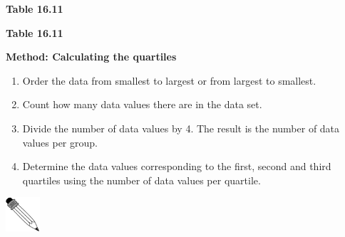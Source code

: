 \begin{description}[noitemsep]
\begin{description}[noitemsep]
\begin{table}[H]
\begin{center}
\begin{xtabular}[t]{|c|c|c|c|c|c|c|c|c|c|c|}
    \end{xtabular}
      \end{center}
    \begin{center}{\small\bfseries Table 16.11}\end{center}
    \begin{caption}{\small\bfseries Table 16.11}\end{caption}
\end{table}
    \par
          \label{m39400*id213452}
            \textbf{Method: Calculating the quartiles}
          \par 
          \label{m39400*id213459}\begin{enumerate}[noitemsep, label=\textbf{\arabic*}. ] 
            \label{m39400*uid76}\item Order the data from smallest to largest or from largest to smallest.
\label{m39400*uid77}\item Count how many data values there are in the data set.
\label{m39400*uid78}\item Divide the number of data values by 4. The result is the number of data values per group.
\label{m39400*uid79}\item Determine the data values corresponding to the first, second and third quartiles using the number of data values per quartile.
\end{enumerate}
\par
            \label{m39400*secfhsst!!!underscore!!!id1723}\vspace{.5cm} 
      \noindent
      \hspace*{-30pt}\includegraphics[width=0.5in]{col11306.imgs/pspencil2.png}   
\end{description}
\end{description}
